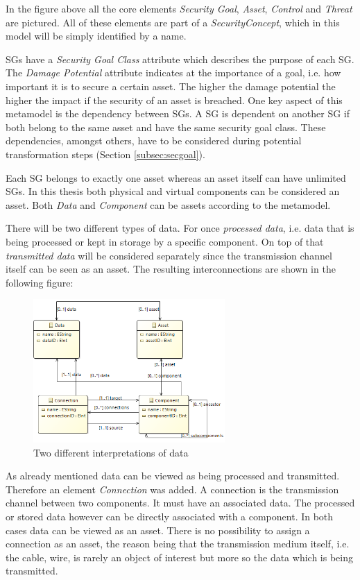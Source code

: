 In the figure above all the core elements \textit{Security Goal}, \textit{Asset}, \textit{Control} and \textit{Threat} are pictured. All of these elements are part of a \textit{SecurityConcept}, which in this model will be simply identified by a name. 

SGs have a \textit{Security Goal Class} attribute which describes the purpose of each SG. The \textit{Damage Potential} attribute indicates at the importance of a goal, i.e. how important it is to secure a certain asset. The higher the damage potential the higher the impact if the security of an asset is breached. One key aspect of this metamodel is the dependency between SGs. A SG is dependent on another SG if both belong to the same asset and have the same security goal class. These dependencies, amongst others, have to be considered during potential transformation steps (Section \ref{subsec:secgoal}). 

Each SG belongs to exactly one asset whereas an asset itself can have unlimited SGs. In this thesis both physical and virtual components can be considered an asset. Both \textit{Data} and \textit{Component} can be assets according to the metamodel. 

There will be two different types of data. For once \textit{processed data}, i.e. data that is being processed or kept in storage by a specific component. On top of that \textit{transmitted data} will be considered separately since the transmission channel itself can be seen as an asset. The resulting interconnections are shown in the following figure:

\begin{figure}[H]
\centering
\includegraphics[width=0.65\textwidth]{pictures/two_data.png}
\caption{Two different interpretations of data}
\label{fig:data}
\end{figure} 

As already mentioned data can be viewed as being processed and transmitted. Therefore an element \textit{Connection} was added. A connection is the transmission channel between two components. It must have an associated data. The processed or stored data however can be directly associated with a component. In both cases data can be viewed as an asset. There is no possibility to assign a connection as an asset, the reason being that the transmission medium itself, i.e. the cable, wire, is rarely an object of interest but more so the data which is being transmitted.


